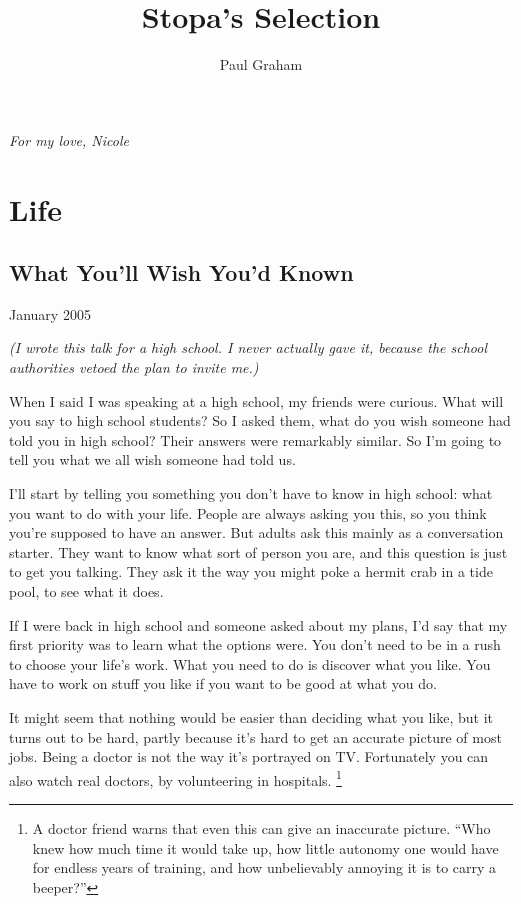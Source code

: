 \documentclass[12pt]{book}
\title{Stopa's Selection}
\author{Paul Graham}
\date{}
\begin{document}
\frontmatter
\maketitle
\tableofcontents
\clearpage
\mainmatter

\cleardoublepage
\thispagestyle{empty}
\vspace*{\fill}
\begin{center}
\textit{For my love, Nicole}
\end{center}
\vspace*{\fill}
\clearpage
\part{Life}
\chapter{What You'll Wish You'd Known}

January 2005

\emph{(I wrote this talk for a high school. I never actually gave it,
because the school authorities vetoed the plan to invite me.)}

When I said I was speaking at a high school, my friends were curious.
What will you say to high school students? So I asked them, what do you
wish someone had told you in high school? Their answers were remarkably
similar. So I'm going to tell you what we all wish someone had told us.

I'll start by telling you something you don't have to know in high
school: what you want to do with your life. People are always asking you
this, so you think you're supposed to have an answer. But adults ask
this mainly as a conversation starter. They want to know what sort of
person you are, and this question is just to get you talking. They ask
it the way you might poke a hermit crab in a tide pool, to see what it
does.

If I were back in high school and someone asked about my plans, I'd say
that my first priority was to learn what the options were. You don't
need to be in a rush to choose your life's work. What you need to do is
discover what you like. You have to work on stuff you like if you want
to be good at what you do.

It might seem that nothing would be easier than deciding what you like,
but it turns out to be hard, partly because it's hard to get an accurate
picture of most jobs. Being a doctor is not the way it's portrayed on
TV. Fortunately you can also watch real doctors, by volunteering in
hospitals. \footnote{A doctor friend warns that even this can give an inaccurate
picture. ``Who knew how much time it would take up, how little autonomy
one would have for endless years of training, and how unbelievably
annoying it is to carry a beeper?''}
\end{document}
